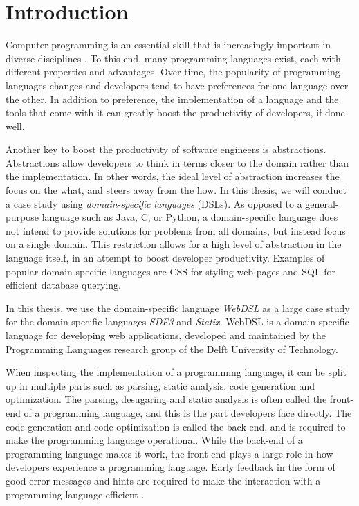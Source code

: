 
\chapter{\label{chap:introduction}Introduction}

  Computer programming is an essential skill that is increasingly important in diverse disciplines \autocite{Rafalski2019}. To this end, many programming languages exist, each with different properties and advantages. Over time, the popularity of programming languages changes and developers tend to have preferences for one language over the other. In addition to preference, the implementation of a language and the tools that come with it can greatly boost the productivity of developers, if done well.

  Another key to boost the productivity of software engineers is abstractions. Abstractions allow developers to think in terms closer to the domain rather than the implementation. In other words, the ideal level of abstraction increases the focus on the what, and steers away from the how. In this thesis, we will conduct a case study using \textit{domain-specific languages} (DSLs). As opposed to a general-purpose language such as Java, C, or Python, a domain-specific language does not intend to provide solutions for problems from all domains, but instead focus on a single domain. This restriction allows for a high level of abstraction in the language itself, in an attempt to boost developer productivity. Examples of popular domain-specific languages are CSS for styling web pages and SQL for efficient database querying.

  In this thesis, we use the domain-specific language \textit{WebDSL} as a large case study for the domain-specific languages \textit{SDF3} and \textit{Statix}. WebDSL is a domain-specific language for developing web applications, developed and maintained by the Programming Languages research group of the Delft University of Technology.

  When inspecting the implementation of a programming language, it can be split up in multiple parts such as parsing, static analysis, code generation and optimization. The parsing, desugaring and static analysis is often called the front-end of a programming language, and this is the part developers face directly. The code generation and code optimization is called the back-end, and is required to make the programming language operational. While the back-end of a programming language makes it work, the front-end plays a large role in how developers experience a programming language. Early feedback in the form of good error messages and hints are required to make the interaction with a programming language efficient \autocite{Becker2019}.

